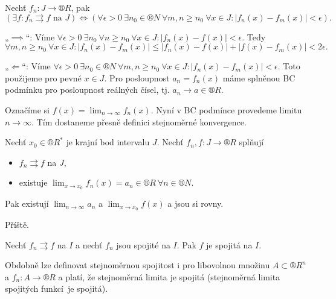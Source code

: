 \documentclass[12pt]{article}					%
\begin{document}
	\begin{veta}
		Nechť $f_n: J \rightarrow ®R$, pak
		$$ (\exists f: f_n \rightrightarrows f \text{ na } J) \Leftrightarrow (\forall \epsilon > 0\ \exists n_0 \in ®N\ \forall m, n ≥ n_0\ \forall x \in J: |f_n(x) - f_m(x)| < \epsilon). $$

		\begin{dukazin}
			„$\implies$“: Víme $\forall \epsilon > 0\ \exists n_0\ \forall n ≥ n_0\ \forall x \in J: |f_n(x) - f(x)| < \epsilon$. Tedy
			$$ \forall m, n ≥ n_0\ \forall x \in J: |f_n(x) - f_m(x)| ≤ |f_n(x) - f(x)| + |f(x) - f_m(x)| < 2\epsilon. $$

			„$\Leftarrow$“: Víme $\forall \epsilon > 0\ \exists n_0 \in ®N\ \forall m, n ≥ n_0\ \forall x \in J: |f_n(x) - f_m(x)| < \epsilon$. Toto použijeme pro pevné $x \in J$. Pro posloupnost $a_n = f_n(x)$ máme splněnou BC podmínku pro posloupnost reálných čísel, tj. $a_n \rightarrow a \in ®R$.

			Označíme si $f(x) = \lim_{n \rightarrow ∞} f_n(x)$. Nyní v BC podmínce provedeme limitu $n \rightarrow ∞$. Tím dostaneme přesně definici stejnoměrné konvergence.
		\end{dukazin}
	\end{veta}

	\begin{veta}
		Nechť $x_0 \in ®R^*$ je krajní bod intervalu $J$. Nechť $f_n, f: J \rightarrow ®R$ splňují

		\begin{itemize}
			\item $f_n \rightrightarrows f$ na $J$,
			\item existuje $\lim_{x \rightarrow x_0} f_n(x) = a_n \in ®R\ \forall n \in ®N$.
		\end{itemize}

		Pak existují $\lim_{n \rightarrow ∞} a_n$ a $\lim_{x \rightarrow x_0} f(x)$ a jsou si rovny.

		\begin{dukazin}
			Příště.
		\end{dukazin}
	\end{veta}

	\begin{dusledek}
		Nechť $f_n \rightrightarrows f$ na $I$ a nechť $f_n$ jsou spojité na $I$. Pak $f$ je spojitá na $I$.
	\end{dusledek}

	\begin{poznamka}
		Obdobně lze definovat stejnoměrnou spojitost i pro libovolnou množinu $A \subset ®R^n$ a $f_n: A \rightarrow ®R$ a platí, že stejnoměrná limita je spojitá (stejnoměrná limita spojitých funkcí je spojitá).
	\end{poznamka}
\end{document}
